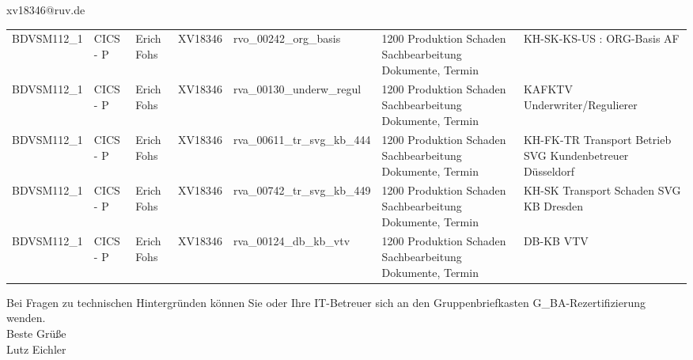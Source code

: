 \documentclass[a4paper,landscape,12pt]{letter}
\begin{document}
\begin{letter}{xv18346@ruv.de\hfill \break}
\begin{tiny}
\begin{longtable}{|p{35mm}|p{15mm}|p{25mm}|p{10mm}|p{40mm}|p{50mm}|p{50mm}|}
BDVSM112\_1 & CICS - P & Erich Fohs & XV18346 & rvo\_00242\_org\_basis & 1200 Produktion Schaden Sachbearbeitung Dokumente, Termin & KH-SK-KS-US : ORG-Basis AF \\
BDVSM112\_1 & CICS - P & Erich Fohs & XV18346 & rva\_00130\_underw\_regul & 1200 Produktion Schaden Sachbearbeitung Dokumente, Termin & KAFKTV Underwriter/Regulierer \\
BDVSM112\_1 & CICS - P & Erich Fohs & XV18346 & rva\_00611\_tr\_svg\_kb\_444 & 1200 Produktion Schaden Sachbearbeitung Dokumente, Termin & KH-FK-TR Transport Betrieb SVG  Kundenbetreuer Düsseldorf \\
BDVSM112\_1 & CICS - P & Erich Fohs & XV18346 & rva\_00742\_tr\_svg\_kb\_449 & 1200 Produktion Schaden Sachbearbeitung Dokumente, Termin & KH-SK Transport Schaden SVG KB Dresden \\
BDVSM112\_1 & CICS - P & Erich Fohs & XV18346 & rva\_00124\_db\_kb\_vtv & 1200 Produktion Schaden Sachbearbeitung Dokumente, Termin & DB-KB VTV \\

\hline
		\end{longtable}
		\end{tiny}
	
\begin{minipage}{\textwidth}
			Bei Fragen zu technischen Hintergründen können Sie 
			oder Ihre IT-Betreuer sich an den Gruppenbriefkasten 
			G\_BA-Rezertifizierung
			wenden.\\
			\linebreak
			Beste Grüße\\
			Lutz Eichler
	\end{minipage}
	\end{letter}
	
\end{document}

